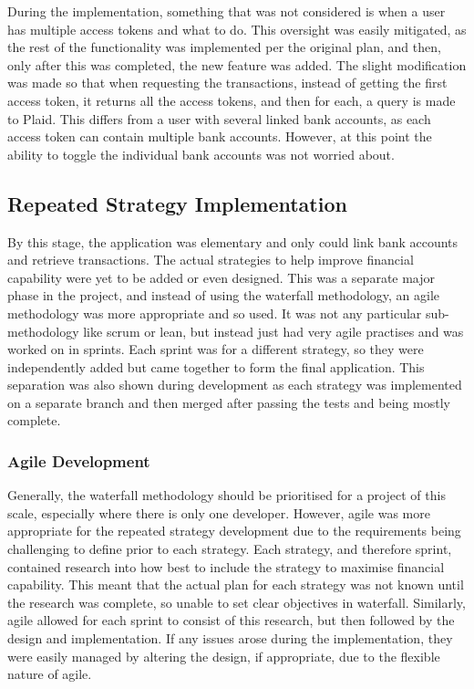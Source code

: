 During the implementation, something that was not considered is when a user has multiple access tokens and what to do. This oversight was easily mitigated, as the rest of the functionality was implemented per the original plan, and then, only after this was completed, the new feature was added. The slight modification was made so that when requesting the transactions, instead of getting the first access token, it returns all the access tokens, and then for each, a query is made to Plaid. This differs from a user with several linked bank accounts, as each access token can contain multiple bank accounts. However, at this point the ability to toggle the individual bank accounts was not worried about.

\subsection{Repeated Strategy Implementation}
By this stage, the application was elementary and only could link bank accounts and retrieve transactions. The actual strategies to help improve financial capability were yet to be added or even designed. This was a separate major phase in the project, and instead of using the waterfall methodology, an agile methodology was more appropriate and so used. It was not any particular sub-methodology like scrum or lean, but instead just had very agile practises and was worked on in sprints. Each sprint was for a different strategy, so they were independently added but came together to form the final application. This separation was also shown during development as each strategy was implemented on a separate branch and then merged after passing the tests and being mostly complete.


\subsubsection{Agile Development}
Generally, the waterfall methodology should be prioritised for a project of this scale, especially where there is only one developer. However, agile was more appropriate for the repeated strategy development due to the requirements being challenging to define prior to each strategy. Each strategy, and therefore sprint, contained research into how best to include the strategy to maximise financial capability. This meant that the actual plan for each strategy was not known until the research was complete, so unable to set clear objectives in waterfall. Similarly, agile allowed for each sprint to consist of this research, but then followed by the design and implementation. If any issues arose during the implementation, they were easily managed by altering the design, if appropriate, due to the flexible nature of agile.

